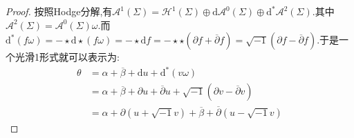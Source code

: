 \begin{enumerate}
\begin{enumerate}
\begin{proof}
			按照Hodge分解,有$\mathscr{A}^1(\Sigma)=\mathscr{H}^1(\Sigma)\oplus\mathrm{d}\mathscr{A}^0(\Sigma)\oplus\mathrm{d}^*\mathscr{A}^2(\Sigma)$.其中$\mathscr{A}^2(\Sigma)=\mathscr{A}^0(\Sigma)\omega$.而$\mathrm{d}^*(f\omega)=-\star\mathrm{d}\star(f\omega)=-\star\mathrm{d}f=-\star\star(\partial f+\overline{\partial}f)=\sqrt{-1}(\partial f-\overline{\partial}f)$.于是一个光滑1形式就可以表示为:
			\begin{align*}
				\theta&=\alpha+\overline{\beta}+\mathrm{d}u+\mathrm{d}^*(v\omega)\\&=\alpha+\overline{\beta}+\partial u+\overline{\partial}u+\sqrt{-1}(\partial v-\overline{\partial}v)\\&=\alpha+\partial(u+\sqrt{-1}v)+\overline{\beta}+\overline{\partial}(u-\sqrt{-1}v)
			\end{align*}
		\end{proof}
	\end{enumerate}
\end{enumerate}

